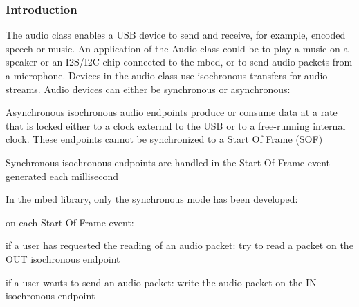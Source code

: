 \documentclass[pdftex,10pt,a4paper]{report}
\newenvironment{packed_item}{
\begin{itemize}
  \setlength{\itemsep}{1pt}
  \setlength{\parskip}{0pt}
  \setlength{\parsep}{0pt}
}{\end{itemize}}
\begin{document}
\subsubsection{Introduction}
The audio class enables a USB device to send and receive, for example, encoded speech or music. An application of the Audio class could be to play a music on a speaker or an I2S/I2C chip connected to the mbed, or to send audio packets from a microphone. Devices in the audio class use isochronous transfers for audio streams. Audio devices can either be synchronous or asynchronous:
\begin{packed_item}
	\item Asynchronous isochronous audio endpoints produce or consume data at a rate that is locked either to a
clock external to the USB or to a free-running internal clock. These endpoints cannot be synchronized to a Start Of Frame (SOF)
	\item Synchronous isochronous endpoints are handled in the Start Of Frame event generated each millisecond
\end{packed_item}
In the mbed library, only the synchronous mode has been developed:
\begin{packed_item}
	\item on each Start Of Frame event:
	\begin{packed_item}
		\item if a user has requested the reading of an audio packet: try to read a packet on the OUT isochronous endpoint
		\item if a user wants to send an audio packet: write the audio packet on the IN isochronous endpoint
	\end{packed_item}
\end{packed_item}
\end{document}
